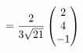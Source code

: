 \documentclass[preview]{standalone}
\begin{document}
\begin{align*}
= {2 \over 3 \sqrt{21}} \begin{pmatrix} 2 \\ 4 \\ -1 \end{pmatrix}
\end{align*}
\end{document}
